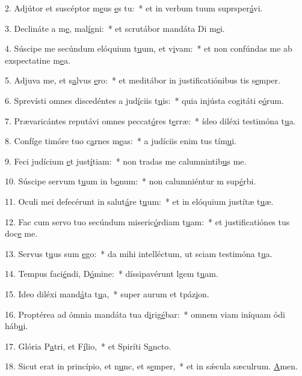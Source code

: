 2. Adjútor et suscéptor m\uline{e}us \uline{e}s tu:~* et in verbum tuum suprsper\uline{á}vi.\par 
3. Declináte a m\uline{e}, mal\uline{í}gni:~* et scrutábor mandáta Di m\uline{e}i.\par 
4. Súscipe me secúndum elóquium t\uline{u}um, et v\uline{i}vam:~* et non confúndas me ab exspectatine m\uline{e}a.\par 
5. Adjuva me, et s\uline{a}lvus \uline{e}ro:~* et meditábor in justificatiónibus tis s\uline{e}mper.\par 
6. Sprevísti omnes discedéntes a jud\uline{í}ciis t\uline{u}is:~* quia injústa cogitáti e\uline{ó}rum.\par 
7. Prævaricántes reputávi omnes peccat\uline{ó}res t\uline{e}rræ:~* ídeo diléxi testimóna t\uline{u}a.\par 
8. Confíge timóre tuo c\uline{a}rnes m\uline{e}as:~* a judíciis enim tus tím\uline{u}i.\par 
9. Feci judícium \uline{e}t just\uline{í}tiam:~* non tradas me calumnintib\uline{u}s me.\par 
10. Súscipe servum t\uline{u}um in b\uline{o}num:~* non calumniéntur m sup\uline{é}rbi.\par 
11. Oculi mei defecérunt in salut\uline{á}re t\uline{u}um:~* et in elóquium justítæ t\uline{u}æ.\par 
12. Fac cum servo tuo secúndum miseric\uline{ó}rdiam t\uline{u}am:~* et justificatiónes tus doc\uline{e} me.\par 
13. Servus t\uline{u}us sum \uline{e}go:~* da mihi intelléctum, ut sciam testimóna t\uline{u}a.\par 
14. Tempus faci\uline{é}ndi, D\uline{ó}mine:~* díssipavérunt lgem t\uline{u}am.\par 
15. Ideo diléxi mand\uline{á}ta t\uline{u}a,~* super aurum et tpáz\uline{i}on.\par 
16. Proptérea ad ómnia mandáta tua d\uline{i}rig\uline{é}bar:~* omnem viam iníquam ódi háb\uline{u}i.\par 
17. Glória P\uline{a}tri, et F\uline{í}lio,~* et Spiríti S\uline{a}ncto.\par 
18. Sicut erat in princípio, et n\uline{u}nc, et s\uline{e}mper,~* et in sǽcula sæculrum. \uline{A}men.\par 

